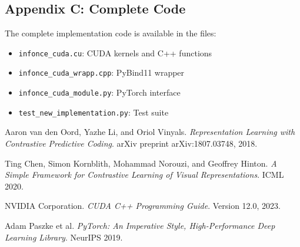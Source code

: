 \documentclass[a4paper,11pt]{article}
\begin{document}
\subsection{Appendix C: Complete Code}

The complete implementation code is available in the files:
\begin{itemize}
    \item \texttt{infonce\_cuda.cu}: CUDA kernels and C++ functions
    \item \texttt{infonce\_cuda\_wrapp.cpp}: PyBind11 wrapper
    \item \texttt{infonce\_cuda\_module.py}: PyTorch interface
    \item \texttt{test\_new\_implementation.py}: Test suite
\end{itemize}


\begin{thebibliography}{9}

Aaron van den Oord, Yazhe Li, and Oriol Vinyals.
\textit{Representation Learning with Contrastive Predictive Coding}.
arXiv preprint arXiv:1807.03748, 2018.

Ting Chen, Simon Kornblith, Mohammad Norouzi, and Geoffrey Hinton.
\textit{A Simple Framework for Contrastive Learning of Visual Representations}.
ICML 2020.

NVIDIA Corporation.
\textit{CUDA C++ Programming Guide}.
Version 12.0, 2023.

Adam Paszke et al.
\textit{PyTorch: An Imperative Style, High-Performance Deep Learning Library}.
NeurIPS 2019.

\end{thebibliography}
\end{document}
